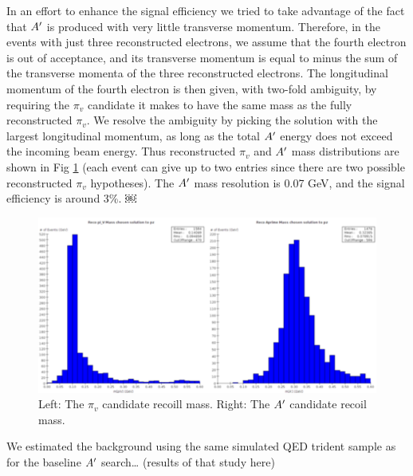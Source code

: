 	In an effort to enhance the signal efficiency we tried to take advantage of the fact that $A^\prime$ is produced with very little transverse momentum. Therefore, in the events with just three reconstructed electrons, we assume that the fourth electron is out of acceptance, and its transverse momentum is equal to minus the sum of the transverse momenta of the three reconstructed electrons. The longitudinal momentum of the fourth electron is then given, with two-fold ambiguity, by requiring the $\pi_v$ candidate it makes to have the same mass as the fully reconstructed $\pi_v$. We resolve the ambiguity by picking the solution with the largest longitudinal momentum, as long as the total $A^\prime$ energy does not exceed the incoming beam energy. Thus reconstructed $\pi_v$ and $A^\prime$ mass distributions are shown in Fig \ref{fig:mlreciolmass} (each event can give up to two entries since there are two possible reconstructed $\pi_v$ hypotheses). The $A^\prime$ mass resolution is 0.07 GeV, and the signal efficiency is around 3\%.
￼


\begin{figure}
\includegraphics[scale=1]{measurements/ML-recoilMass.pdf}
\caption{Left:  The $\pi_v$ candidate recoill mass.  Right:  The $A^\prime$ candidate recoil mass.}
\label{fig:mlreciolmass}
\end{figure}

	We estimated the background using the same simulated QED trident sample as for the baseline $A^\prime$ search… (results of that study here)
